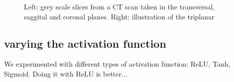 \begin{figure}
\centering
\begin{minipage}{0.45\textwidth}
\centering
{}
\end{minipage}\hfill
\hspace{-1cm}
\begin{minipage}{0.45\textwidth}
\centering
{}
\end{minipage}
\caption{Left: grey scale slices from a CT scan taken in the transversal, saggital and coronal planes. Right: illustration of the triplanar}
\end{figure}

\subsection{varying the activation function}

We experimented with different types of activation function: ReLU, Tanh, Sigmoid. Doing it with ReLU is better...

